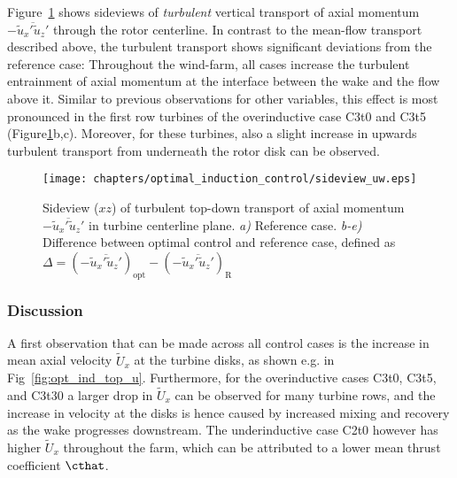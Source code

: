 	Figure~\ref{fig:opt_ind_side_uw} shows sideviews of \emph{turbulent} vertical transport of axial momentum $- \overline{\widetilde{u}_x'\widetilde{u}_z'}$ through the rotor centerline. In contrast to the mean-flow transport described above, the turbulent transport shows significant deviations from the reference case: Throughout the wind-farm, all cases increase the turbulent entrainment of axial momentum at the interface between the wake and the flow above it. Similar to previous observations for other variables, this effect is most pronounced in the first row turbines of the overinductive case C3t0 and C3t5 (Figure\ref{fig:opt_ind_side_uw}b,c). Moreover, for these turbines, also a slight increase in upwards turbulent transport from underneath the rotor disk can be observed.

	\begin{figure}[bt]
		\centering
		\texttt{[image: chapters/optimal\_induction\_control/sideview\_uw.eps]}
		\caption[Sideview ($xz$) of turbulent top-down transport of axial momentum $- \overline{\widetilde{u}_x'\widetilde{u}_z'}$ in turbine centerline plane.]{Sideview ($xz$) of turbulent top-down transport of axial momentum $- \overline{\widetilde{u}_x'\widetilde{u}_z'}$ in turbine centerline plane. \emph{a) } Reference case. \emph{b-e)} Difference between optimal control and reference case, defined as $\Delta = (- \overline{\widetilde{u}_x'\widetilde{u}_z'})_{\text{opt}} - (- \overline{\widetilde{u}_x'\widetilde{u}_z'})_{\text{R}}$  \label{fig:opt_ind_side_uw}}
	\end{figure}	

	\subsubsection{Discussion}
	 A first observation that can be made across all control cases is the increase in mean axial velocity $\widetilde{U}_x$ at the turbine disks, as shown e.g. in Fig~\ref{fig:opt_ind_top_u}. Furthermore, for the overinductive cases C3t0, C3t5, and C3t30 a larger drop in $\widetilde{U}_x$ can be observed for many turbine rows, and the increase in velocity at the disks is hence caused by increased mixing and recovery as the wake progresses downstream. The underinductive case C2t0 however has higher $\widetilde{U}_x$ throughout the farm, which can be attributed to a lower mean thrust coefficient $\cthat$. 
	 
